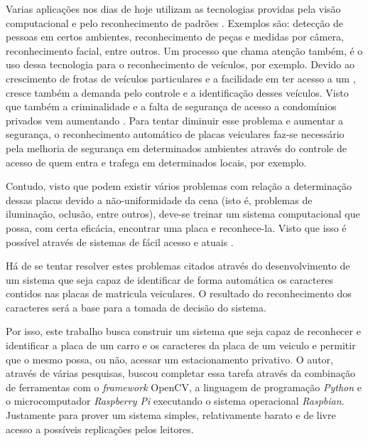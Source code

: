 Varias aplicações nos dias de hoje utilizam as tecnologias providas pela visão computacional e pelo reconhecimento de padrões \cite{duda2001}. Exemplos são: detecção de pessoas em certos ambientes, reconhecimento de peças e medidas por câmera, reconhecimento facial, entre outros. Um processo que chama atenção também, é o uso dessa tecnologia para o reconhecimento de veículos, por exemplo. Devido ao crescimento de frotas de veículos particulares e a facilidade em ter acesso a um \cite{dia2016,reis2014}, cresce também a demanda pelo controle e a identificação desses veículos. Visto que também a criminalidade e a falta de segurança de acesso a condomínios privados vem aumentando \cite{dia2017,prado2017,ama2017}. Para tentar diminuir esse problema e aumentar a segurança, o reconhecimento automático de placas veiculares faz-se necessário pela melhoria de segurança em determinados ambientes através do controle de acesso de quem entra e trafega em determinados locais, por exemplo.

Contudo, visto que podem existir vários problemas com relação a determinação dessas placas devido a não-uniformidade da cena (isto é, problemas de iluminação, oclusão, entre outros), deve-se treinar um sistema computacional que possa, com certa eficácia, encontrar uma placa e reconhece-la. Visto que isso é possível através de sistemas de fácil acesso e atuais \cite{luka2014}. 


Há de se tentar resolver estes problemas citados através do desenvolvimento de um sistema que seja capaz de identificar de forma automática os caracteres contidos nas placas de matricula veiculares. O resultado do reconhecimento dos caracteres será a base para a tomada de decisão do sistema.

Por isso, este trabalho busca construir um sistema que seja capaz de reconhecer e identificar a placa de um carro e os caracteres da placa de um veiculo e permitir que o mesmo possa, ou não, acessar um estacionamento privativo. O autor, através de várias pesquisas, buscou completar essa tarefa através da combinação de ferramentas com o \emph{framework} OpenCV, a linguagem de programação \emph{Python} e o microcomputador \emph{Raspberry Pi} executando o sistema operacional \emph{Raspbian}. Justamente para prover um sistema simples, relativamente barato e de livre acesso a possíveis replicações pelos leitores.


